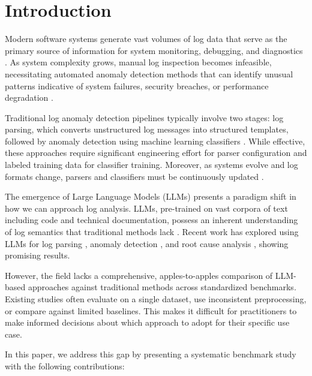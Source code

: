 \documentclass[conference]{IEEEtran}
\begin{document}
\section{Introduction}

Modern software systems generate vast volumes of log data that serve as the primary source of information for system monitoring, debugging, and diagnostics \cite{he2021survey}. As system complexity grows, manual log inspection becomes infeasible, necessitating automated anomaly detection methods that can identify unusual patterns indicative of system failures, security breaches, or performance degradation \cite{zhang2019robust}.

Traditional log anomaly detection pipelines typically involve two stages: log parsing, which converts unstructured log messages into structured templates, followed by anomaly detection using machine learning classifiers \cite{zhu2019tools}. While effective, these approaches require significant engineering effort for parser configuration and labeled training data for classifier training. Moreover, as systems evolve and log formats change, parsers and classifiers must be continuously updated \cite{le2022log}.

The emergence of Large Language Models (LLMs) presents a paradigm shift in how we can approach log analysis. LLMs, pre-trained on vast corpora of text including code and technical documentation, possess an inherent understanding of log semantics that traditional methods lack \cite{le2023log}. Recent work has explored using LLMs for log parsing \cite{xu2024divlog}, anomaly detection \cite{liu2024logprompt}, and root cause analysis \cite{chen2024automatic}, showing promising results.

However, the field lacks a comprehensive, apples-to-apples comparison of LLM-based approaches against traditional methods across standardized benchmarks. Existing studies often evaluate on a single dataset, use inconsistent preprocessing, or compare against limited baselines. This makes it difficult for practitioners to make informed decisions about which approach to adopt for their specific use case.

In this paper, we address this gap by presenting a systematic benchmark study with the following contributions:
\end{document}
